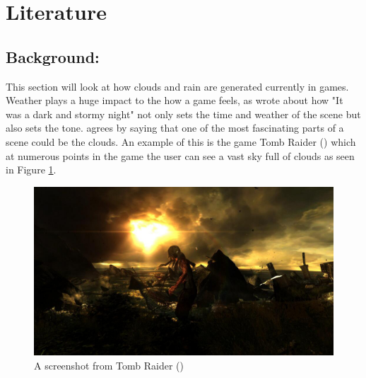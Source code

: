 \clearpage
\section{Literature}
\label{sec:LR}
\subsection{Background:}
\label{sec:back}
This section will look at how clouds and rain are generated currently in games.
Weather plays a huge impact to the how a game feels, as \citet{Barton08} wrote about how "It was a dark and stormy night" not only sets the time and weather of the scene but also sets the tone.
\citet{NWang04} agrees by saying that one of the most fascinating parts of a scene could be the clouds.
An example of this is the game Tomb Raider (\citeyear{TombRaider13}) which at numerous points in the game the user can see a vast sky full of clouds as seen in Figure \ref{fig:tomb_raider}. 

\begin{figure}[ht!]
	\centering
	\includegraphics[width=\textwidth]{images/tomb_raider.PNG}
	\caption{A screenshot from Tomb Raider (\citeyear{TombRaider13})}
	\label{fig:tomb_raider}
\end{figure}




